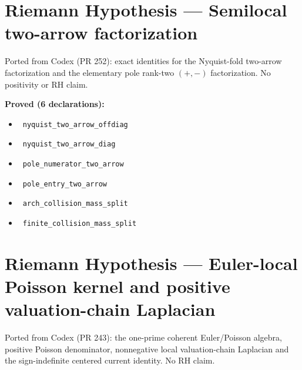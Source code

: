 \documentclass{report}
\theoremstyle{definition}
\begin{document}
\section{Riemann Hypothesis --- Semilocal two-arrow factorization}
Ported from Codex (PR 252): exact identities for the Nyquist-fold two-arrow factorization and the elementary pole rank-two $(+,-)$ factorization. No positivity or RH claim.

\noindent\textbf{Proved (6 declarations):}
\begin{itemize}
  \item {}\leanok\ \texttt{nyquist\_two\_arrow\_offdiag}
  \item {}\leanok\ \texttt{nyquist\_two\_arrow\_diag}
  \item {}\leanok\ \texttt{pole\_numerator\_two\_arrow}
  \item {}\leanok\ \texttt{pole\_entry\_two\_arrow}
  \item {}\leanok\ \texttt{arch\_collision\_mass\_split}
  \item {}\leanok\ \texttt{finite\_collision\_mass\_split}
\end{itemize}

\section{Riemann Hypothesis --- Euler-local Poisson kernel and positive valuation-chain Laplacian}
Ported from Codex (PR 243): the one-prime coherent Euler/Poisson algebra, positive Poisson denominator, nonnegative local valuation-chain Laplacian and the sign-indefinite centered current identity. No RH claim.
\end{document}
